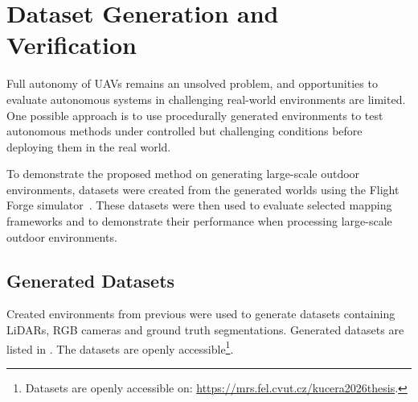 \chapter{Dataset Generation and Verification}

Full autonomy of \ac{UAV}s remains an unsolved problem, and opportunities to evaluate autonomous systems in challenging real-world environments are limited. One possible approach is to use procedurally generated environments to test autonomous methods under controlled but challenging conditions before deploying them in the real world.

To demonstrate the proposed method on generating large-scale outdoor environments, datasets were created from the generated worlds using the Flight Forge simulator~\cite{bk_flight_forge}. These datasets were then used to evaluate selected mapping frameworks and to demonstrate their performance when processing large-scale outdoor environments.

\section{Generated Datasets}

Created environments from previous  were used to generate datasets containing \ac{LiDAR}s, RGB cameras and ground truth segmentations. Generated datasets are listed in . The datasets are openly accessible\footnote{Datasets are openly accessible on: \url{https://mrs.fel.cvut.cz/kucera2026thesis}.}.

